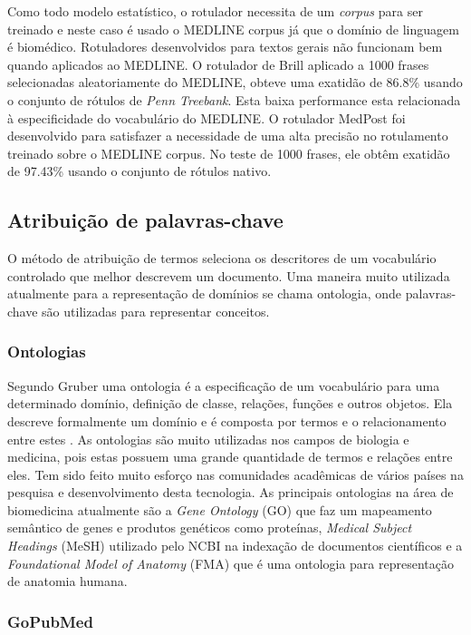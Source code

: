 Como todo modelo estatístico, o rotulador necessita de um \emph{corpus} para ser treinado e neste caso é usado o MEDLINE corpus já que o domínio de linguagem é biomédico. Rotuladores desenvolvidos para textos gerais não funcionam bem quando aplicados ao MEDLINE. O rotulador de Brill \cite{Brill1992} aplicado a 1000 frases selecionadas aleatoriamente do MEDLINE, obteve uma exatidão de 86.8\% usando o conjunto de rótulos de \emph{Penn Treebank}. Esta baixa performance esta relacionada à especificidade do vocabulário do MEDLINE. O rotulador MedPost \cite{Smith2004} foi desenvolvido para satisfazer a necessidade de uma alta precisão no rotulamento treinado sobre o MEDLINE corpus. No teste de 1000 frases, ele obtêm exatidão de 97.43\% usando o conjunto de rótulos nativo.

\subsection{Atribuição de palavras-chave}
O método de atribuição de termos seleciona os descritores de um vocabulário controlado que melhor descrevem um documento. Uma maneira muito utilizada atualmente para a representação de domínios se chama ontologia, onde palavras-chave são utilizadas para representar conceitos.

\subsubsection{Ontologias}

 Segundo Gruber \cite{Gruber1993} uma ontologia é a especificação de um vocabulário para uma determinado domínio, definição de classe, relações, funções e outros objetos. Ela descreve formalmente um domínio e é composta por termos e o relacionamento entre estes \cite{Antoniou2004}. As ontologias são muito utilizadas nos campos de biologia e medicina, pois estas possuem uma grande quantidade de termos e relações entre eles. Tem sido feito muito esforço nas comunidades acadêmicas de vários países na pesquisa e desenvolvimento desta tecnologia. As principais ontologias na área de biomedicina atualmente são a \emph{Gene Ontology} (GO) \cite{GO2000} que faz um mapeamento semântico de genes e produtos genéticos como proteínas, \emph{Medical Subject Headings} (MeSH) \cite{MESH2000} utilizado pelo NCBI na indexação de documentos científicos e a \emph{Foundational Model of Anatomy}  (FMA) \cite{FMA2003} que é uma ontologia para representação de anatomia humana.

\subsubsection{GoPubMed}

